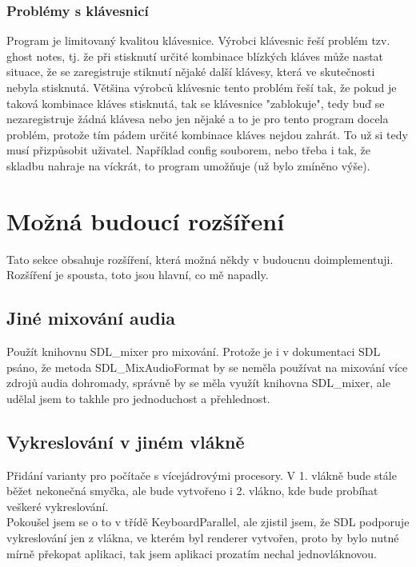 \documentclass[12pt]{article}
\begin{document}
	\subsubsection{Problémy s klávesnicí}
	Program je limitovaný kvalitou klávesnice. Výrobci klávesnic řeší problém tzv. ghost notes, tj. že při stisknutí určité kombinace blízkých kláves může nastat situace, že se zaregistruje stiknutí nějaké další klávesy, která ve skutečnosti nebyla stisknutá. Většina výrobců klávesnic tento problém řeší tak, že pokud je taková kombinace kláves stisknutá, tak se klávesnice "zablokuje", tedy buď se nezaregistruje žádná klávesa nebo jen nějaké a to je pro tento program docela problém, protože tím pádem určité kombinace kláves nejdou zahrát. To už si tedy musí přizpůsobit uživatel. Například config souborem, nebo třeba i tak, že skladbu nahraje na víckrát, to program umožňuje (už bylo zmíněno výše).
	
	
	\newpage
	\maketitle\section{Možná budoucí rozšíření}	
	Tato sekce obsahuje rozšíření, která možná někdy v budoucnu doimplementuji.
	\\
	Rozšíření je spousta, toto jsou hlavní, co mě napadly.
	\subsection{Jiné mixování audia}
	Použít knihovnu SDL\_mixer pro mixování. Protože je i v dokumentaci SDL psáno, že metoda SDL\_MixAudioFormat by se neměla používat na mixování více zdrojů audia dohromady, správně by se měla využít knihovna SDL\_mixer, ale udělal jsem to takhle pro jednoduchost a přehlednost.
	\subsection{Vykreslování v jiném vlákně}
	Přidání varianty pro počítače s vícejádrovými procesory. V 1. vlákně bude stále běžet nekonečná smyčka, ale bude vytvořeno i 2. vlákno, kde bude probíhat veškeré vykreslování.
	\\
	Pokoušel jsem se o to v třídě KeyboardParallel, ale zjistil jsem, že SDL podporuje vykreslování jen z vlákna, ve kterém byl renderer vytvořen, proto by bylo nutné mírně překopat aplikaci, tak jsem aplikaci prozatím nechal jednovláknovou.
\end{document}
